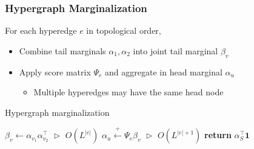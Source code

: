 \documentclass{beamer}
\begin{document}
\begin{frame}
\frametitle{Hypergraph Marginalization}
For each hyperedge $e$ in topological order,
\vspace{1em}
\begin{itemize}
\item Combine tail marginals $\alpha_1,\alpha_2$ into joint tail marginal $\beta_v$
\vspace{1em}
\item Apply score matrix $\Psi_e$ and aggregate in head marginal $\alpha_u$
    \begin{itemize}
    \item Multiple hyperedges may have the same head node
    \end{itemize}
\end{itemize}
\vspace{1em}
\centering
\begin{algorithm}[H]
\caption{\label{alg:hypergraph-marg} Hypergraph marginalization}
\begin{algorithmic} 
\STATE $\beta_v \gets \alpha_{v_1}\alpha_{v_2}^\top$
    \hfill $\vartriangleright$ $O(L^{|e|})$
\STATE $\alpha_u \stackrel{+}{\gets} \Psi_e\beta_v$
    \hfill $\vartriangleright$ $O(L^{|e|+1})$
\ENDFOR
\STATE \textbf{return} $\alpha_S^\top \mathbf{1}$
\end{algorithmic}

\end{algorithm}
\end{frame}
\end{document}
